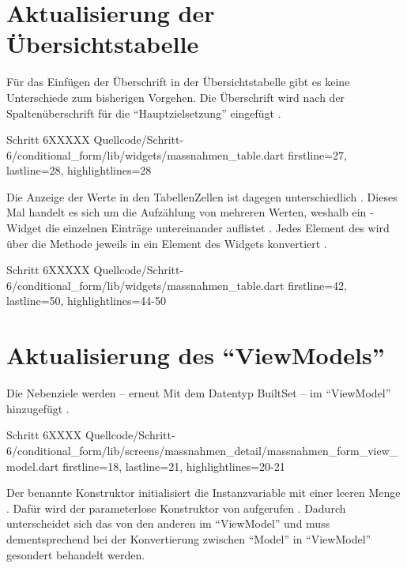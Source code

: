 \section{Aktualisierung der Übersichtstabelle}

Für das Einfügen der Überschrift in der Übersichtstabelle gibt es keine Unterschiede zum bisherigen Vorgehen.
Die Überschrift wird nach der Spaltenüberschrift für die \enquote{Hauptzielsetzung} eingefügt .

\begin{alexlisting}{Schritt 6}{XXXXX}
  {Quellcode/Schritt-6/conditional_form/lib/widgets/massnahmen_table.dart}
  {firstline=27, lastline=28, highlightlines={28}}
  \label{lst:Schritt6buildColumnHeader}
\end{alexlisting}

Die Anzeige der Werte in den TabellenZellen ist dagegen unterschiedlich \Lst{\ref{lst:Schritt6buildSelectableCell}}.
Dieses Mal handelt es sich um die Aufzählung von mehreren Werten,
weshalb ein -Widget die einzelnen Einträge untereinander auflistet .
Jedes Element des    wird über die Methode  jeweils in ein Element des Widgets  konvertiert .

\begin{alexlisting}{Schritt 6}{XXXXX}
  {Quellcode/Schritt-6/conditional_form/lib/widgets/massnahmen_table.dart}
  {firstline=42, lastline=50, highlightlines={44-50}}
  \label{lst:Schritt6buildSelectableCell}
\end{alexlisting}

\section{Aktualisierung des \enquote{ViewModels}}

Die Nebenziele werden -- erneut Mit dem Datentyp BuiltSet -- im \enquote{ViewModel} hinzugefügt \Lst{\ref{lst:Schritt6BehaviorSubjectNebenziele}}.
\begin{alexlisting}{Schritt 6}{XXXX}
  {Quellcode/Schritt-6/conditional_form/lib/screens/massnahmen_detail/massnahmen_form_view_model.dart}
  {firstline=18, lastline=21, highlightlines={20-21}}
  \label{lst:Schritt6BehaviorSubjectNebenziele}
\end{alexlisting}

Der benannte Konstruktor  initialisiert die Instanzvariable mit  einer leeren Menge .
Dafür wird der parameterlose Konstruktor von  aufgerufen .
Dadurch unterscheidet sich das  von den anderen im \enquote{ViewModel}
und muss dementsprechend bei der Konvertierung zwischen \enquote{Model} in \enquote{ViewModel} gesondert behandelt werden.

